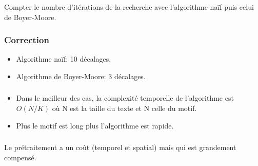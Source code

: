 \documentclass[svgnames,11pt]{beamer}
\begin{document}
\begin{frame}
    \frametitle{}
    \begin{activite}
        Compter le nombre d'itérations de la recherche avec l'algorithme naïf puis celui de Boyer-Moore.
        \end{activite}
    

\end{frame}
\begin{frame}
    \frametitle{Correction}

    \begin{itemize}
        \item Algorithme naïf: 10 décalages,
        \item Algorithme de Boyer-Moore: 3 décalages.
    \end{itemize}

\end{frame}
\begin{frame}
    \frametitle{}

    \begin{aretenir}[Remarques]
        \begin{itemize}
            \item Dans le meilleur des cas, la complexité temporelle de l'algorithme est $O(N/K)$ où N est la taille du texte et N celle du motif.
            \item Plus le motif est long plus l'algorithme est rapide.
        \end{itemize}
        \end{aretenir}

\end{frame}
\begin{frame}
    \frametitle{}

    Le prétraitement a un coût (temporel et spatial) mais qui est grandement compensé.

\end{frame}
\end{document}
